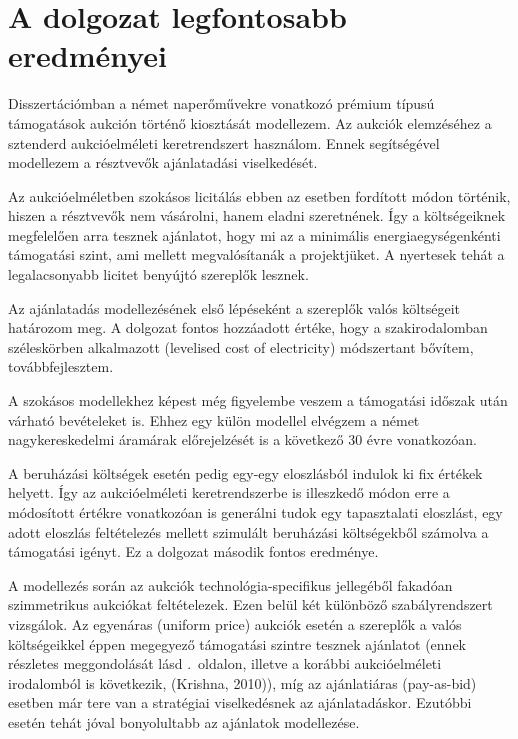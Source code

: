 \documentclass[twoside, magyar, showtrims]{corvinusphd}
\theoremstyle{plain}
\theoremstyle{remark}
\theoremstyle{definition}
\begin{document}
\section{A dolgozat legfontosabb eredményei}

Disszertációmban a német naperőművekre vonatkozó prémium típusú támogatások
aukción történő kiosztását modellezem.
Az aukciók elemzéséhez a sztenderd aukcióelméleti keretrendszert használom.
Ennek segítségével modellezem a résztvevők ajánlatadási viselkedését.

Az aukcióelméletben szokásos licitálás ebben az esetben fordított módon történik,
hiszen a résztvevők nem vásárolni, hanem eladni szeretnének.
Így a költségeiknek megfelelően arra tesznek ajánlatot, hogy mi az a
minimális energiaegységenkénti támogatási szint, ami mellett megvalósítanák a projektjüket.
A nyertesek tehát a legalacsonyabb licitet benyújtó szereplők lesznek.

Az ajánlatadás modellezésének első lépéseként a szereplők valós költségeit határozom
meg. A dolgozat fontos hozzáadott értéke, hogy a szakirodalomban széleskörben
alkalmazott  (levelised cost of electricity)
módszertant bővítem, továbbfejlesztem.

A szokásos modellekhez képest
még figyelembe veszem a támogatási időszak után várható bevételeket is.
Ehhez egy külön modellel elvégzem
a német nagykereskedelmi áramárak előrejelzését is a következő 30 évre vonatkozóan.

A beruházási költségek esetén pedig egy-egy eloszlásból indulok ki fix értékek helyett.
Így az aukcióelméleti keretrendszerbe is illeszkedő módon
erre a módosított  értékre vonatkozóan is  generálni
tudok egy tapasztalati eloszlást, egy adott eloszlás feltételezés
mellett szimulált beruházási költségekből számolva a támogatási igényt.
Ez a dolgozat második fontos eredménye.

A modellezés során az aukciók technológia-specifikus
jellegéből fakadóan szimmetrikus aukciókat feltételezek.
Ezen belül két különböző szabályrendszert vizsgálok.
Az egyenáras (uniform price) aukciók esetén a szereplők
a valós költségeikkel éppen megegyező támogatási szintre tesznek ajánlatot
(ennek részletes meggondolását lásd \pageref{uniform}.~oldalon, 
illetve a korábbi aukcióelméleti irodalomból is következik,
(Krishna, 2010)), míg az ajánlatiáras (pay-as-bid) esetben már tere van
a stratégiai viselkedésnek az ajánlatadáskor. 
Ezutóbbi esetén tehát jóval bonyolultabb az ajánlatok modellezése.
\end{document}

